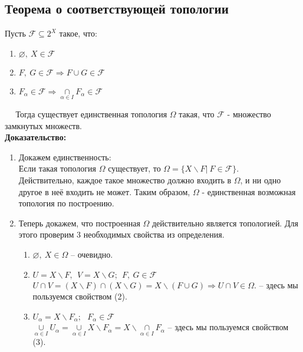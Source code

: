 \documentclass[10pt]{report}
\begin{document}
\begin{spacing}{1.5}
\subsection{Теорема о соответствующей топологии}
  Пусть $ \mathcal{F} \subseteq 2^{X}$  такое, что:
\begin{enumerate}
\item $\varnothing ,~X\in \mathcal{F}$
\item $F,~G\in \mathcal{F} \Longrightarrow F\cup G\in \mathcal{F}$
\item $F_{\alpha}\in \mathcal{F} \Longrightarrow \underset{\alpha\in I}{\cap}F_{\alpha}\in \mathcal{F}$
\end{enumerate}
$~~~~~~$Тогда существует единственная топология $\Omega$ такая, что $\mathcal{F}$ - множество замкнутых множеств.
\\
\textbf{Доказательство:}
 \begin{enumerate}
\item Докажем единственность:\\
Если такая топология $\Omega$ существует, то $\Omega = \lbrace X\backslash F|~F\in \mathcal{F}\rbrace$.
\\ Действительно, каждое такое множество должно входить в $\Omega$, и ни одно другое в неё входить не может. Таким образом, $\Omega$ - единственная возможная топология по построению.
\item Теперь докажем, что построенная $\Omega$ действительно является топологией. Для этого проверим 3 необходимых свойства из определения.
\begin{enumerate}
\item $\varnothing,~X \in\Omega$ -- очевидно.
\item $U = X\backslash F,~~V=X\backslash G; ~~F,~G\in \mathcal{F}$
\\$U\cap V = (X\backslash F)\cap (X\backslash G)=X\backslash (F\cup G) \Longrightarrow U\cap V\in\Omega.$ -- здесь мы пользуемся свойством (2).
\item $U_{\alpha} = X\backslash F_{\alpha};~~~F_{\alpha}\in \mathcal{F}$
\\$\underset{\alpha\in I}{\cup}U_{\alpha} = \underset{\alpha\in I}{\cup}X\backslash F_{\alpha} = X\backslash\underset{\alpha\in I}{\cap}F_{\alpha}$ -- здесь мы пользуемся свойством (3).
\end{enumerate} 
\end{enumerate}
\newpage

\end{spacing}
\end{document}
